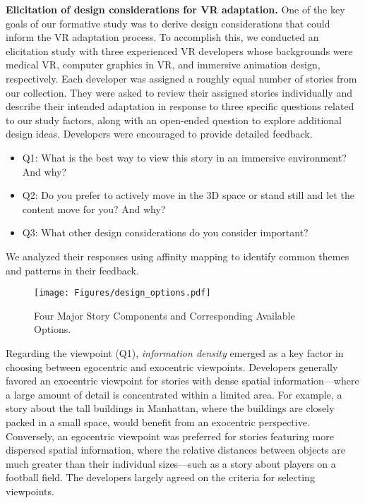 \textbf{Elicitation of design considerations for VR adaptation.}
One of the key goals of our formative study was to derive design considerations that could inform the VR adaptation process. 
To accomplish this, we conducted an elicitation study with three experienced VR developers {whose backgrounds were medical VR, computer graphics in VR, and immersive animation design, respectively}. Each developer was assigned a roughly equal number of stories from our collection. They were asked to review their assigned stories individually and describe their intended adaptation in response to three specific questions related to our study factors, along with an open-ended question to explore additional design ideas. Developers were encouraged to provide detailed feedback.
\begin{itemize}
    \item Q1: What is the best way to view this story in an immersive environment? And why?
    \item Q2: Do you prefer to actively move in the 3D space or stand still and let the content move for you? And why?
    \item Q3: What other design considerations do you consider important?
\end{itemize}
We analyzed their responses using affinity mapping to identify common themes and patterns in their feedback.
\begin{figure*}[t]
\centering
  \texttt{[image: Figures/design\_options.pdf]}
  \caption{Four Major Story Components and Corresponding Available Options.}
  \label{fig:design_options}
\end{figure*}
Regarding the viewpoint (Q1), \textit{information density} emerged as a key factor in choosing between egocentric and exocentric viewpoints. Developers generally favored an exocentric viewpoint for stories with dense spatial information—where a large amount of detail is concentrated within a limited area. For example, a story about the tall buildings in Manhattan, where the buildings are closely packed in a small space, would benefit from an exocentric perspective. Conversely, an egocentric viewpoint was preferred for stories featuring more dispersed spatial information, where the relative distances between objects are much greater than their individual sizes—such as a story about players on a football field. The developers largely agreed on the criteria for selecting viewpoints.

